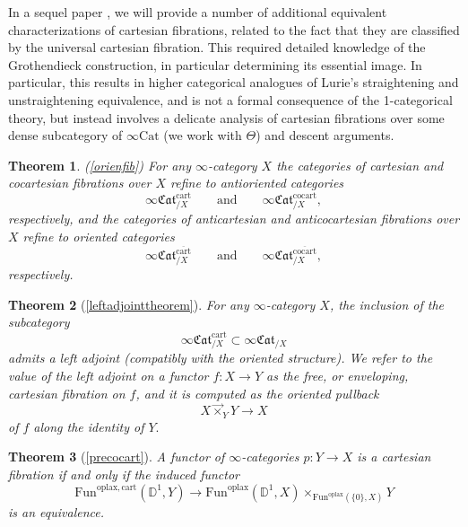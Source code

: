 \documentclass[10pt,oneside]{article}
\numberwithin{equation}{section} %
\numberwithin{figure}{section} %
\theoremstyle{plain}
\newtheorem{theorem}{Theorem}[subsection]
\theoremstyle{definition}
\newcommand{\bD}{{\mathbb D}}
\newcommand{\Cat}{\mathrm{Cat}}
\newcommand{\Fun}{\mathrm{Fun}}
\newcommand{\cocart}{{\mathrm{cocart}}}
\newcommand{\cart}{{\mathrm{cart}}}
\newcommand{\bicart}{{\mathrm{bicart}}}
\newcommand{\oplax}{{\mathrm{oplax}}}
\newcommand{\fcat}{\mathfrak{Cat}}
\begin{document}
In a sequel paper \cite{OrientedGrothendieck2026}, we will provide a number of additional equivalent characterizations of cartesian fibrations, related to the fact that they are classified by the universal cartesian fibration.
This required detailed knowledge of the Grothendieck construction, in particular determining its essential image.
In particular, this results in higher categorical analogues of Lurie's straightening and unstraightening equivalence, and is not a formal consequence of the 1-categorical theory, but instead involves a delicate analysis of cartesian fibrations over some dense subcategory of $\infty\Cat$ (we work with $\Theta$) and descent arguments.


\begin{theorem}(\cref{orienfib})
For any $\infty$-category $X$ the categories of cartesian and cocartesian fibrations over $X$ refine to antioriented categories
\[
\infty\fcat^{\cart}_{/X}\qquad\textrm{and}\qquad\infty\fcat^{\cocart}_{/X},
\]
respectively,
and the categories of anticartesian and anticocartesian fibrations over $X$ refine to oriented categories
\[
\infty\fcat^{\overline{\cart}}_{/X}\qquad\textrm{and}\qquad\infty\fcat^{\overline{\cocart}}_{/X},
\]
respectively.

\end{theorem}


\begin{theorem}[{\cref{leftadjointtheorem}}]
For any $\infty$-category $X$, the inclusion of the subcategory
\[
\infty\fcat^{\cart}_{/X}\subset\infty\fcat_{/X}
\]
admits a left adjoint (compatibly with the oriented structure).
We refer to the value of the left adjoint
on a functor $f : X \to Y$ as the free, or enveloping, cartesian fibration on $f$, and it is computed as the oriented pullback $$ X \vec{\times}_Y Y \to X $$ of $f$ along the identity of $Y.$
\end{theorem}





\begin{theorem}[{\cref{precocart}}]
    A functor of $\infty$-categories $p:Y\to X$ is a cartesian fibration if and only if the induced functor
    $$
    \Fun^{\oplax, \cart}(\bD^1,Y) \to \Fun^\oplax(\bD^1,X) \times_{\Fun^\oplax(\{0\},X)} Y
    $$
    is an equivalence.
\end{theorem}
\end{document}
